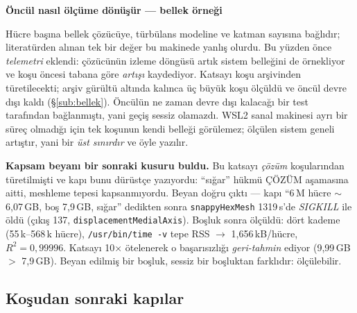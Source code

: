 \documentclass[11pt,a4paper]{article}
\newcommand{\kkkenar}{lacivert}
\newcommand{\kkzemin}{kod}
\newenvironment{renkkutu}[3]{%
  \renewcommand{\kkkenar}{#1}\renewcommand{\kkzemin}{#2}%
  \par\medskip\noindent
  \begin{lrbox}{\kutugovde}%
  \begin{minipage}{\dimexpr\linewidth-2\fboxsep-2\fboxrule\relax}\footnotesize
  \textcolor{#1}{\textbf{#3}}\par\vspace{3pt}%
}{%
  \end{minipage}%
  \end{lrbox}%
  \noindent\fcolorbox{\kkkenar}{\kkzemin}{\usebox{\kutugovde}}%
  \par\medskip
}
\newenvironment{anafikir}[1]{\begin{renkkutu}{lacivert}{kod}{#1}}{\end{renkkutu}}
\begin{document}
\begin{anafikir}{Öncül nasıl ölçüme dönüşür --- bellek örneği}
Hücre başına bellek çözücüye, türbülans modeline ve katman sayısına bağlıdır;
literatürden alınan tek bir değer bu makinede yanlış olurdu. Bu yüzden önce
\emph{telemetri} eklendi: çözücünün izleme döngüsü artık sistem belleğini de
örnekliyor ve koşu öncesi tabana göre \emph{artışı} kaydediyor. Katsayı koşu
arşivinden türetilecekti; arşiv gürültü altında kalınca üç büyük koşu ölçüldü
ve öncül devre dışı kaldı (\S\ref{sub:bellek}). Öncülün ne zaman devre dışı
kalacağı bir test tarafından bağlanmıştı, yani geçiş sessiz olamazdı.
WSL2 sanal makinesi ayrı bir süreç olmadığı için tek
koşunun kendi belleği görülemez; ölçülen sistem geneli artıştır, yani bir
\emph{üst sınırdır} ve öyle yazılır.

\smallskip
\noindent\textbf{Kapsam beyanı bir sonraki kusuru buldu.} Bu katsayı
\emph{çözüm} koşularından türetilmişti ve kapı bunu dürüstçe yazıyordu:
``sığar'' hükmü ÇÖZÜM aşamasına aitti, meshleme tepesi kapsanmıyordu. Beyan
doğru çıktı --- kapı ``6\,M hücre $\sim$6{,}07\,GB, boş 7{,}9\,GB, sığar''
dedikten sonra \texttt{snappyHexMesh} 1319\,s'de \emph{SIGKILL} ile öldü
(çıkış 137, \texttt{displacementMedialAxis}). Boşluk sonra ölçüldü: dört
kademe (55\,k--568\,k hücre), \texttt{/usr/bin/time -v} tepe RSS $\rightarrow$
1{,}656\,kB/hücre, $R^2{=}0{,}99996$. Katsayı 10$\times$ ötelenerek o
başarısızlığı \emph{geri-tahmin} ediyor (9{,}99\,GB $>$ 7{,}9\,GB). Beyan
edilmiş bir boşluk, sessiz bir boşluktan farklıdır: ölçülebilir.
\end{anafikir}

\subsection{Koşudan sonraki kapılar}
\end{document}

